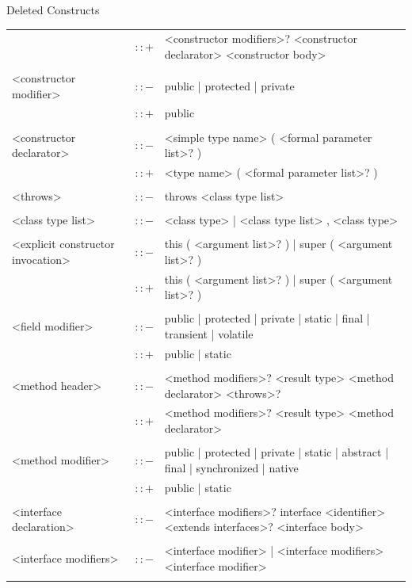 \documentclass[landscape, 11pt]{article}
\begin{document}
\begin{qsection}{Deleted Constructs}
\begin{enumerate}[label=\bt{\theenumi.}]
\begin{longtable}{R{7cm} c L{15cm}}
															&	$\colon\colon+$	&	<constructor modifiers>? <constructor declarator> <constructor body> \\\\
				<constructor modifier>						&	$\colon\colon-$	&	public | protected | private \\
															&	$\colon\colon+$	&	public \\\\
				<constructor declarator>					&	$\colon\colon-$	&	<simple type name> ( <formal parameter list>? ) \\
															&	$\colon\colon+$	&	<type name> ( <formal parameter list>? ) \\\\
				<throws>									&	$\colon\colon-$	&	throws <class type list> \\\\
				<class type list>							&	$\colon\colon-$	&	<class type> | <class type list> , <class type> \\\\
				<explicit constructor invocation>			&	$\colon\colon-$	&	this ( <argument list>? ) | super ( <argument list>? ) \\
															&	$\colon\colon+$	&	this ( <argument list>? ) | super ( <argument list>? ) \\\\
				<field modifier>							&	$\colon\colon-$	&	public | protected | private | static | final | transient | volatile \\
															&	$\colon\colon+$	&	public | static \\\\
				<method header>								&	$\colon\colon-$	&	<method modifiers>? <result type> <method declarator> <throws>? \\
															&	$\colon\colon+$	&	<method modifiers>? <result type> <method declarator> \\\\
				<method modifier>							&	$\colon\colon-$	&	public | protected | private | static | abstract | final | synchronized | native \\
															&	$\colon\colon+$	&	public | static \\\\
				<interface declaration>						&	$\colon\colon-$	&	<interface modifiers>? interface <identifier> <extends interfaces>? <interface body> \\\\
				<interface modifiers>						&	$\colon\colon-$	&	<interface modifier> | <interface modifiers> <interface modifier> \\\\

\end{longtable}
\end{enumerate}
\end{qsection}
\end{document}

